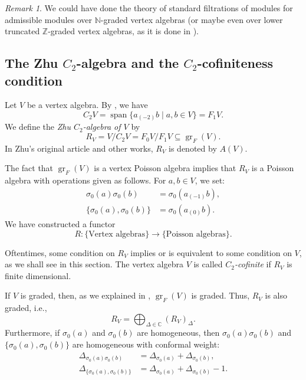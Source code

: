 \documentclass[a4paper, 12pt, reqno]{amsart}
\theoremstyle{remark}
\newtheorem{remark}[theorem]{Remark}
\DeclareMathOperator{\gr}{gr}
\DeclareMathOperator{\vspan}{span}
\begin{document}
\begin{remark}
  \label{rmk:44}
  We could have done the theory of standard filtrations of modules for admissible modules over $\mathbb{N}$-graded vertex algebras (or maybe even over lower truncated $\mathbb{Z}$-graded vertex algebras, as it is done in \cite{li_vertex_2004}).
\end{remark}

\subsection{The Zhu $C_2$-algebra and the $C_2$-cofiniteness condition}
\label{sec:zhu-c_2-algebra}

Let $V$ be a vertex algebra.
By , we have
\begin{equation*}
  C_2V = \vspan\{a_{(-2)}b \mid a, b \in V\} = F_1V.
\end{equation*}
We define the \emph{Zhu $C_2$-algebra of $V$} by
\begin{equation*}
  R_V = V/C_2V = F_0V/F_1V \subseteq \gr_F(V).
\end{equation*}
In Zhu's original article \cite{zhu_modular_1996} and other works, $R_V$ is denoted by $A(V)$.

The fact that $\gr_F(V)$ is a vertex Poisson algebra implies that $R_V$ is a Poisson algebra with operations given as follows.
For $a, b \in V$, we set:
\begin{align*}
  \sigma_0(a)\sigma_0(b) &= \sigma_0(a_{(-1)}b), \\
  \{\sigma_0(a), \sigma_0(b)\} &= \sigma_0(a_{(0)}b).
\end{align*}
We have constructed a functor
\begin{equation*}
  R: \{\text{Vertex algebras}\} \to \{\text{Poisson algebras}\}.
\end{equation*}

Oftentimes, some condition on $R_V$ implies or is equivalent to some condition on $V$, as we shall see in this section.
The vertex algebra $V$ is called \emph{$C_2$-cofinite} if $R_V$ is finite dimensional.

If $V$ is graded, then, as we explained in , $\gr_F(V)$ is graded.
Thus, $R_V$ is also graded, i.e.,
\begin{equation*}
  R_V = \bigoplus_{\Delta \in \mathbb{C}}(R_V)_{\Delta}.
\end{equation*}
Furthermore, if $\sigma_0(a)$ and $\sigma_0(b)$ are homogeneous, then $\sigma_0(a)\sigma_0(b)$ and $\{\sigma_0(a), \sigma_0(b)\}$ are homogeneous with conformal weight:
\begin{align*}
  \Delta_{\sigma_0(a)\sigma_0(b)} &= \Delta_{\sigma_0(a)} + \Delta_{\sigma_0(b)}, \\
  \Delta_{\{\sigma_0(a), \sigma_0(b)\}} &= \Delta_{\sigma_0(a)} + \Delta_{\sigma_0(b)} - 1.
\end{align*}
\end{document}
